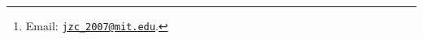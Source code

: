 \author{Zhicheng Jiang\thanks{Email: \href{mailto:jzc_2007@mit.edu}{\texttt{jzc\_2007@mit.edu}}.} \\
Massachusetts Institute of Technology \\
2077 AI
\And
Ningshan Ma \\
Massachusetts Institute of Technology
}
